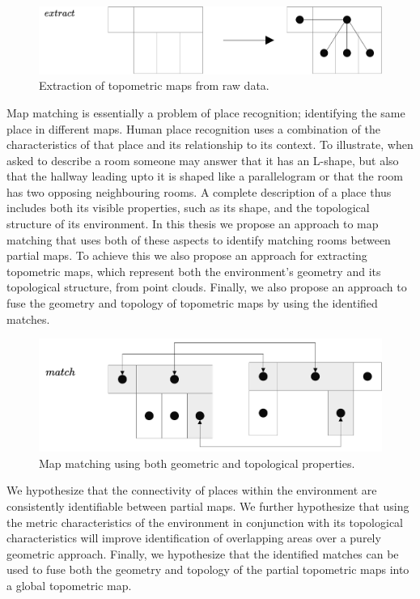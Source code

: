 \begin{figure}[h]
    \centering
    \includegraphics*[width=.8\textwidth]{./fig/overview_diagrams-Page-2.drawio.pdf}
    \caption{Extraction of topometric maps from raw data.}
    \label{fig:overview}
\end{figure}


Map matching is essentially a problem of place recognition; identifying the same place in different maps. Human place recognition uses a combination of the characteristics of that place and its relationship to its context. To illustrate, when asked to describe a room someone may answer that it has an L-shape, but also that the hallway leading upto it is shaped like a parallelogram or that the room has two opposing neighbouring rooms. A complete description of a place thus includes both its visible properties, such as its shape, and the topological structure of its environment. In this thesis we propose an approach to map matching that uses both of these aspects to identify matching rooms between partial maps. To achieve this we also propose an approach for extracting topometric maps, which represent both the environment's geometry and its topological structure, from point clouds. Finally, we also propose an approach to fuse the geometry and topology of topometric maps by using the identified matches.


\begin{figure}[h]
    \centering
    \includegraphics*[width=.8\textwidth]{./fig/overview_diagrams-Page-3.drawio.pdf}
    \caption{Map matching using both geometric and topological properties.}
    \label{fig:overview_diagram}

\end{figure}


We hypothesize that the connectivity of places within the environment are consistently identifiable between partial maps. We further hypothesize that using the metric characteristics of the environment in conjunction with its topological characteristics will improve identification of overlapping areas over a purely geometric approach. Finally, we hypothesize that the identified matches can be used to fuse both the geometry and topology of the partial topometric maps into a global topometric map.

